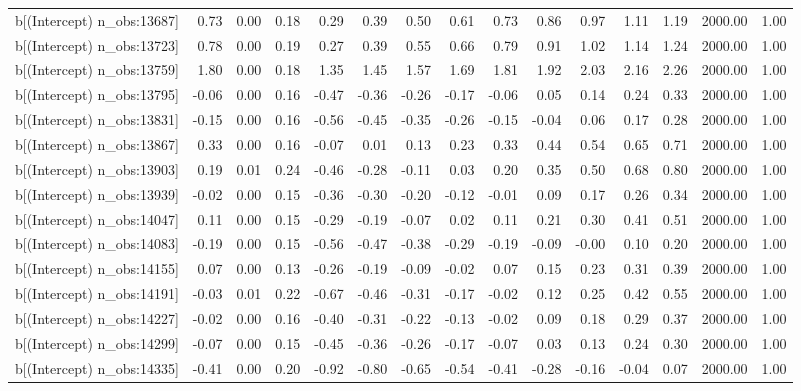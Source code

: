 \begin{table}[ht]
\begin{tabular}{rrrrrrrrrrrrrrr}
  b[(Intercept) n\_obs:13687] & 0.73 & 0.00 & 0.18 & 0.29 & 0.39 & 0.50 & 0.61 & 0.73 & 0.86 & 0.97 & 1.11 & 1.19 & 2000.00 & 1.00 \\ 
  b[(Intercept) n\_obs:13723] & 0.78 & 0.00 & 0.19 & 0.27 & 0.39 & 0.55 & 0.66 & 0.79 & 0.91 & 1.02 & 1.14 & 1.24 & 2000.00 & 1.00 \\ 
  b[(Intercept) n\_obs:13759] & 1.80 & 0.00 & 0.18 & 1.35 & 1.45 & 1.57 & 1.69 & 1.81 & 1.92 & 2.03 & 2.16 & 2.26 & 2000.00 & 1.00 \\ 
  b[(Intercept) n\_obs:13795] & -0.06 & 0.00 & 0.16 & -0.47 & -0.36 & -0.26 & -0.17 & -0.06 & 0.05 & 0.14 & 0.24 & 0.33 & 2000.00 & 1.00 \\ 
  b[(Intercept) n\_obs:13831] & -0.15 & 0.00 & 0.16 & -0.56 & -0.45 & -0.35 & -0.26 & -0.15 & -0.04 & 0.06 & 0.17 & 0.28 & 2000.00 & 1.00 \\ 
  b[(Intercept) n\_obs:13867] & 0.33 & 0.00 & 0.16 & -0.07 & 0.01 & 0.13 & 0.23 & 0.33 & 0.44 & 0.54 & 0.65 & 0.71 & 2000.00 & 1.00 \\ 
  b[(Intercept) n\_obs:13903] & 0.19 & 0.01 & 0.24 & -0.46 & -0.28 & -0.11 & 0.03 & 0.20 & 0.35 & 0.50 & 0.68 & 0.80 & 2000.00 & 1.00 \\ 
  b[(Intercept) n\_obs:13939] & -0.02 & 0.00 & 0.15 & -0.36 & -0.30 & -0.20 & -0.12 & -0.01 & 0.09 & 0.17 & 0.26 & 0.34 & 2000.00 & 1.00 \\ 
  b[(Intercept) n\_obs:14047] & 0.11 & 0.00 & 0.15 & -0.29 & -0.19 & -0.07 & 0.02 & 0.11 & 0.21 & 0.30 & 0.41 & 0.51 & 2000.00 & 1.00 \\ 
  b[(Intercept) n\_obs:14083] & -0.19 & 0.00 & 0.15 & -0.56 & -0.47 & -0.38 & -0.29 & -0.19 & -0.09 & -0.00 & 0.10 & 0.20 & 2000.00 & 1.00 \\ 
  b[(Intercept) n\_obs:14155] & 0.07 & 0.00 & 0.13 & -0.26 & -0.19 & -0.09 & -0.02 & 0.07 & 0.15 & 0.23 & 0.31 & 0.39 & 2000.00 & 1.00 \\ 
  b[(Intercept) n\_obs:14191] & -0.03 & 0.01 & 0.22 & -0.67 & -0.46 & -0.31 & -0.17 & -0.02 & 0.12 & 0.25 & 0.42 & 0.55 & 2000.00 & 1.00 \\ 
  b[(Intercept) n\_obs:14227] & -0.02 & 0.00 & 0.16 & -0.40 & -0.31 & -0.22 & -0.13 & -0.02 & 0.09 & 0.18 & 0.29 & 0.37 & 2000.00 & 1.00 \\ 
  b[(Intercept) n\_obs:14299] & -0.07 & 0.00 & 0.15 & -0.45 & -0.36 & -0.26 & -0.17 & -0.07 & 0.03 & 0.13 & 0.24 & 0.30 & 2000.00 & 1.00 \\ 
  b[(Intercept) n\_obs:14335] & -0.41 & 0.00 & 0.20 & -0.92 & -0.80 & -0.65 & -0.54 & -0.41 & -0.28 & -0.16 & -0.04 & 0.07 & 2000.00 & 1.00 \\ 

\end{tabular}
\end{table}
